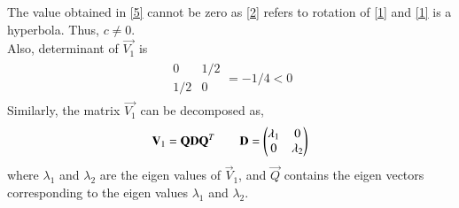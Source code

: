 \documentclass[journal,12pt,twocolumn]{IEEEtran}
\begin{document}
The value obtained in \eqref{5} cannot be zero as \eqref{2} refers to rotation of \eqref{1} and \eqref{1} is a hyperbola. Thus, $c \not=0$. \\
Also, determinant of $\vec{V_1}$ is
\begin{align}
	\begin{array}{|cc|}
		0 & 1/2\\ 1/2 & 0
	\end{array} = -1/4 < 0
\end{align}
Similarly, the matrix $\vec{V_1}$ can be decomposed as,
\begin{align}
	\mathbf V_1= \mathbf{Q}\mathbf{D}\mathbf{Q}^T \qquad \mathbf{D} = \begin{pmatrix}\lambda_1 & 0 \\ 0 & \lambda_2\end{pmatrix}
\end{align}
where $\lambda_1$ and $\lambda_2$ are the eigen values of $\vec{V}_1$, and $\vec{Q}$ contains the eigen vectors corresponding to the eigen values $\lambda_1$ and $\lambda_2$. 
\end{document}
